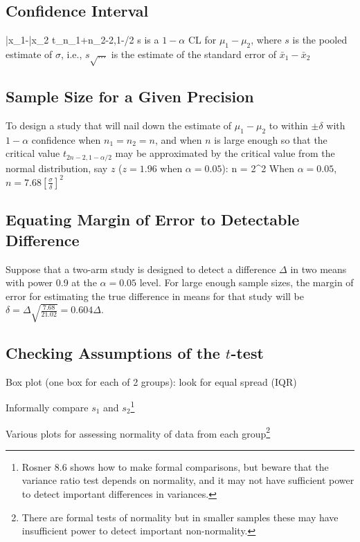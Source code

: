 \subsection{Confidence Interval}  
\beq
\bar{x}_{1}-\bar{x}_{2} \pm t_{n_{1}+n_{2}-2,1-\alpha/2} \times s \times
{}
\eeq
is a $1-\alpha$ CL for $\mu_{1}-\mu_{2}$, where $s$ is the pooled
estimate of $\sigma$, i.e., $s \sqrt{\ldots}$ is the estimate of the
standard error of $\bar{x}_{1}-\bar{x}_{2}$

\subsection{Sample Size for a Given Precision}
To design a study that will nail down the estimate of $\mu_{1}-\mu_{2}$
to within $\pm \delta$ with $1-\alpha$ confidence when $n_{1}=n_{2}=n$, and
when $n$ is large enough so that the critical value
$t_{2n-2,1-\alpha/2}$ may be approximated by the critical value from
the normal distribution, say $z$ ($z=1.96$ when $\alpha=0.05$):
\beq
n = 2^{2}
\eeq
When $\alpha=0.05$, $n = 7.68 [\frac{\sigma}{\delta}]^{2}$

\subsection{Equating Margin of Error to Detectable Difference}
Suppose that a two-arm study is designed to detect a difference $\Delta$ in two
means with power 0.9 at the $\alpha=0.05$ level.  For large enough
sample sizes, the margin of error for estimating the true difference
in means for that study will be $\delta =
\Delta\sqrt{\frac{7.68}{21.02}} = 0.604\Delta$.

\subsection{Checking Assumptions of the $t$-test}
\bi
\item Box plot (one box for each of 2 groups): look for equal spread
  (IQR)
\item Informally compare $s_{1}$ and $s_{2}$\footnote{Rosner 8.6 shows how to
  make formal comparisons, but beware that the variance ratio test
  depends on normality, and it may not have sufficient power to detect
  important differences in variances.}
\item Various plots for assessing normality of data from each
  group\footnote{There are formal tests of normality but in smaller
    samples these may have insufficient power to detect important
    non-normality.}
\ei


